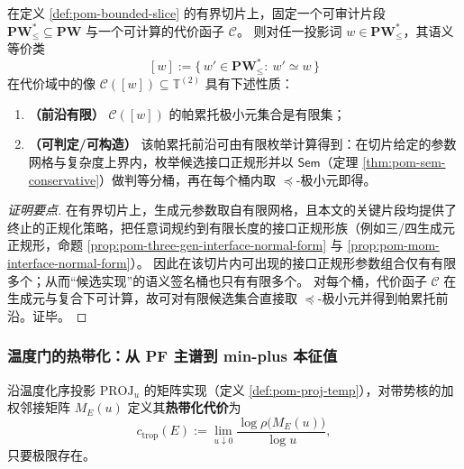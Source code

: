 \begin{proposition}\label{prop:pom-cost-optimization-decidable}
在定义 \ref{def:pom-bounded-slice} 的有界切片上，固定一个可审计片段 \(\mathbf{PW}^{\ast}_{\le}\subseteq\mathbf{PW}\) 与一个可计算的代价函子 \(\mathcal{C}\)。
则对任一投影词 \(w\in\mathbf{PW}^{\ast}_{\le}\)，其语义等价类
\[
[w]:=\{\,w'\in\mathbf{PW}^{\ast}_{\le}:\ w'\simeq w\,\}
\]
在代价域中的像
\(
\mathcal{C}([w])\subseteq \mathbb{T}^{(2)}
\)
具有下述性质：
\begin{enumerate}
  \item \textbf{（前沿有限）} \(\mathcal{C}([w])\) 的帕累托极小元集合是有限集；
  \item \textbf{（可判定/可构造）} 该帕累托前沿可由有限枚举计算得到：在切片给定的参数网格与复杂度上界内，枚举候选接口正规形并以 \(\mathsf{Sem}\)（定理 \ref{thm:pom-sem-conservative}）做判等分桶，再在每个桶内取 \(\preceq\)-极小元即得。
\end{enumerate}
\end{proposition}
\begin{proof}[证明要点]
在有界切片上，生成元参数取自有限网格，且本文的关键片段均提供了终止的正规化策略，把任意词规约到有限长度的接口正规形族（例如三/四生成元正规形，命题 \ref{prop:pom-three-gen-interface-normal-form} 与 \ref{prop:pom-mom-interface-normal-form}）。
因此在该切片内可出现的接口正规形参数组合仅有有限多个；从而“候选实现”的语义签名桶也只有有限多个。
对每个桶，代价函子 \(\mathcal{C}\) 在生成元与复合下可计算，故可对有限候选集合直接取 \(\preceq\)-极小元并得到帕累托前沿。证毕。
\end{proof}



\subsubsection{温度门的热带化：从 PF 主谱到 min-plus 本征值}\label{subsec:pom-proj-tropicalization}
\begin{definition}[温度门的热带化代价]\label{def:pom-proj-tropical-cost}
沿温度化序投影 \(\mathrm{PROJ}_u\) 的矩阵实现（定义 \ref{def:pom-proj-temp}），对带势核的加权邻接矩阵 \(M_E(u)\) 定义其\textbf{热带化代价}为
$$
c_{\mathrm{trop}}(E)
:=\lim_{u\downarrow 0}\frac{\log \rho\!\bigl(M_E(u)\bigr)}{\log u},
$$
只要极限存在。
\end{definition}

